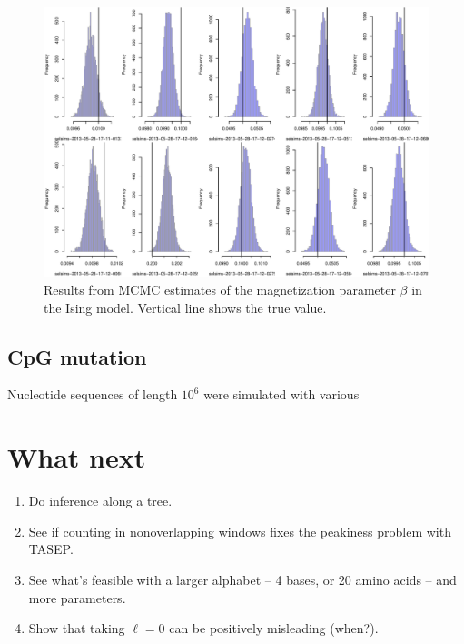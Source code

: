 \documentclass{article}
\theoremstyle{plain}
\theoremstyle{definition}
\begin{document}
\begin{figure}
  \begin{center}
    \includegraphics[width=\textwidth,page=3]{ising/all-mcmc-runs}
  \end{center}
  \caption{ Results from MCMC estimates of the magnetization parameter $\beta$ in the Ising model. 
  Vertical line shows the true value.
  }
\end{figure}

\subsection{CpG mutation}

Nucleotide sequences of length $10^6$ were simulated with various 


\section{What next}

\begin{enumerate}

  \item Do inference along a tree.

  \item See if counting in nonoverlapping windows fixes the peakiness problem with TASEP.

  \item See what's feasible with a larger alphabet -- 4 bases, or 20 amino acids -- and more parameters.

  \item Show that taking $\ell=0$ can be positively misleading (when?).

\end{enumerate}
\end{document}
